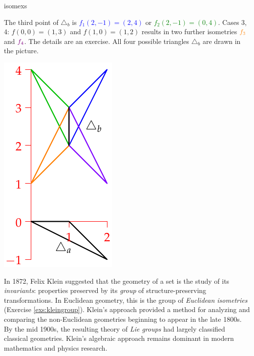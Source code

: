 \begin{examples}{}{isomexs}
\begin{enumerate}
\begin{minipage}[t]{0.76\linewidth}
	  The third point of $\triangle_b$ is \textcolor{blue}{$f_1(2,-1)=(2,4)$} or \textcolor{Green}{$f_2(2,-1)=(0,4)$}.\medbreak
	  Cases 3,\,4: $f(0,0)=(1,3)$ and $f(1,0)=(1,2)$ results in two further isometries $\textcolor{orange}{f_3}$ and $\textcolor{Purple}{f_4}$. The details are an exercise.\medbreak
	  All four possible triangles $\triangle_b$ are drawn in the picture.
	  \end{minipage}
	  \hfill
	  \begin{minipage}[t]{0.23\linewidth}\vspace{-10pt}
	  	\flushright\includegraphics[scale=0.95]{isom-ex}
	  \end{minipage}
	\end{enumerate}
\end{examples}



In 1872, Felix Klein suggested that the geometry of a set is the study of its \emph{invariants}: properties preserved by its \emph{group} of structure-preserving transformations. In Euclidean geometry, this is the group of \emph{Euclidean isometries} (Exercise \ref{exs:kleingroup}). Klein's approach provided a method for analyzing and comparing the non-Euclidean geometries beginning to appear in the late 1800s. By the mid 1900s, the resulting theory of \emph{Lie groups} had largely classified classical geometries. Klein's algebraic approach remains dominant in modern mathematics and physics research.


